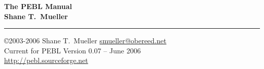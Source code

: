\documentclass[letter,11pt]{report}
\begin{document}
\begin{center}
\LARGE
\textbf{The PEBL Manual} \\
\vspace{0.7cm}\Large \textbf{Shane T.~Mueller}
\end{center}
\rule{\textwidth}{1mm}


\vspace{.4cm}

\normalsize
\noindent\copyright 2003-2006 Shane T.~Mueller \href{mailto:smueller@obereed.net}{smueller@obereed.net}\\
Current for PEBL Version 0.07 -- June 2006 \\
\href{http://pebl.sourceforge.net}{http://pebl.sourceforge.net}
\tableofcontents

\clearpage
{}











\appendix
\end{document}
